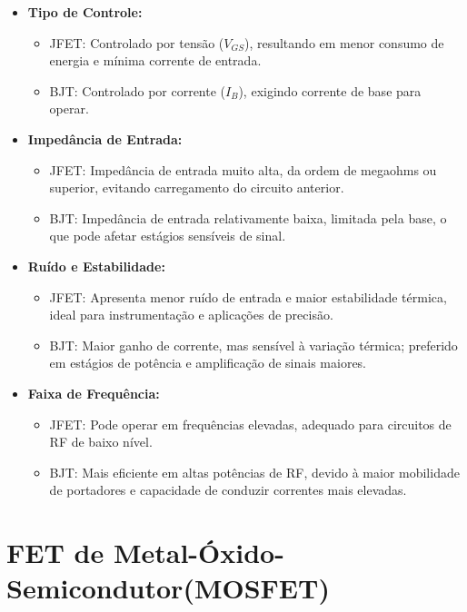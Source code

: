 \documentclass[12pt]{article}
\begin{document}
\begin{itemize}
    \item \textbf{Tipo de Controle:} 
    \begin{itemize}
        \item JFET: Controlado por tensão (\(V_{GS}\)), resultando em menor consumo de energia e mínima corrente de entrada.
        \item BJT: Controlado por corrente (\(I_B\)), exigindo corrente de base para operar.
    \end{itemize}

    \item \textbf{Impedância de Entrada:} 
    \begin{itemize}
        \item JFET: Impedância de entrada muito alta, da ordem de megaohms ou superior, evitando carregamento do circuito anterior.
        \item BJT: Impedância de entrada relativamente baixa, limitada pela base, o que pode afetar estágios sensíveis de sinal.
    \end{itemize}

    \item \textbf{Ruído e Estabilidade:} 
    \begin{itemize}
        \item JFET: Apresenta menor ruído de entrada e maior estabilidade térmica, ideal para instrumentação e aplicações de precisão.
        \item BJT: Maior ganho de corrente, mas sensível à variação térmica; preferido em estágios de potência e amplificação de sinais maiores.
    \end{itemize}

    \item \textbf{Faixa de Frequência:} 
    \begin{itemize}
        \item JFET: Pode operar em frequências elevadas, adequado para circuitos de RF de baixo nível.
        \item BJT: Mais eficiente em altas potências de RF, devido à maior mobilidade de portadores e capacidade de conduzir correntes mais elevadas.
    \end{itemize}
\end{itemize}


\section{FET de Metal-Óxido-Semicondutor(MOSFET)}
\end{document}
